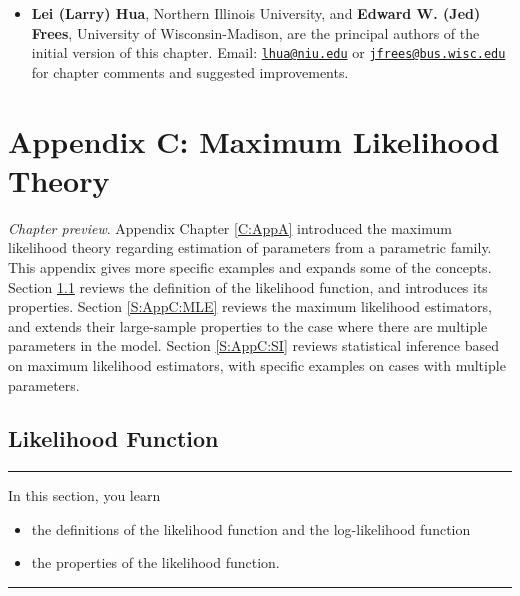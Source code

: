 \documentclass[]{book}
\providecommand{\tightlist}{%
  \setlength{\itemsep}{0pt}\setlength{\parskip}{0pt}}
\theoremstyle{definition}
\theoremstyle{definition}
\theoremstyle{definition}
\theoremstyle{remark}
\begin{document}
\begin{itemize}
\tightlist
\item
  \textbf{Lei (Larry) Hua}, Northern Illinois University, and
  \textbf{Edward W. (Jed) Frees}, University of Wisconsin-Madison, are
  the principal authors of the initial version of this chapter. Email:
  \href{mailto:lhua@niu.edu}{\nolinkurl{lhua@niu.edu}} or
  \href{mailto:jfrees@bus.wisc.edu}{\nolinkurl{jfrees@bus.wisc.edu}} for
  chapter comments and suggested improvements.
\end{itemize}

\chapter{Appendix C: Maximum Likelihood Theory}\label{C:AppC}

\emph{Chapter preview}. Appendix Chapter \ref{C:AppA} introduced the
maximum likelihood theory regarding estimation of parameters from a
parametric family. This appendix gives more specific examples and
expands some of the concepts. Section \ref{S:AppC:LF} reviews the
definition of the likelihood function, and introduces its properties.
Section \ref{S:AppC:MLE} reviews the maximum likelihood estimators, and
extends their large-sample properties to the case where there are
multiple parameters in the model. Section \ref{S:AppC:SI} reviews
statistical inference based on maximum likelihood estimators, with
specific examples on cases with multiple parameters.

\section{Likelihood Function}\label{S:AppC:LF}

\begin{center}\rule{0.5\linewidth}{\linethickness}\end{center}

In this section, you learn

\begin{itemize}
\tightlist
\item
  the definitions of the likelihood function and the log-likelihood
  function
\item
  the properties of the likelihood function.
\end{itemize}

\begin{center}\rule{0.5\linewidth}{\linethickness}\end{center}
\end{document}
